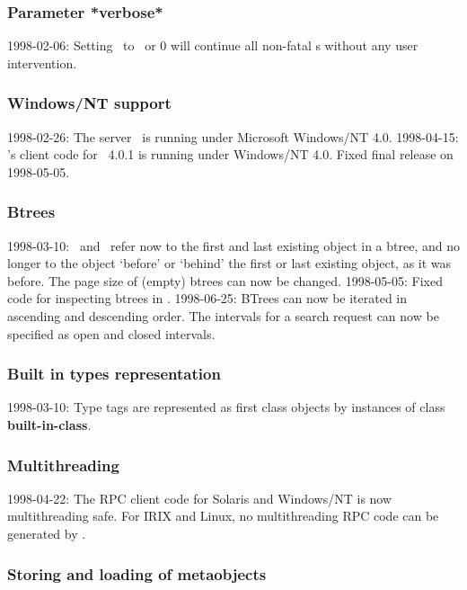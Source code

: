 \subsubsection{Parameter *verbose*}

1998-02-06: Setting \ to \lispnil\ or 0 will continue
all non-fatal s without any user intervention.

\subsubsection{Windows/NT support}

1998-02-26: The server \ is running under Microsoft
Windows/NT 4.0.  1998-04-15: \plobwoexcl's client code for \lwcl\ 
4.0.1 is running under Windows/NT 4.0. Fixed final release on
1998-05-05.

\subsubsection{Btrees}

1998-03-10: \ and \ 
refer now to the first and last existing object in a btree, and no
longer to the object `before' or `behind' the first or last
existing object, as it was before. The page size of (empty) btrees can
now be changed.  1998-05-05: Fixed code for inspecting btrees in
\lwcl.  1998-06-25: BTrees can now be iterated in ascending and
descending order. The intervals for a search request can now be
specified as open and closed intervals.

\subsubsection{Built in types representation}

1998-03-10: Type tags are represented as first class objects by
instances of class \textbf{built-in-class}.

\subsubsection{Multithreading}

1998-04-22: The RPC client code for Solaris and Windows/NT is now
multithreading safe. For IRIX and Linux, no multithreading RPC code
can be generated by \lisp{rpcgen}.

\subsubsection{Storing and loading of metaobjects}

